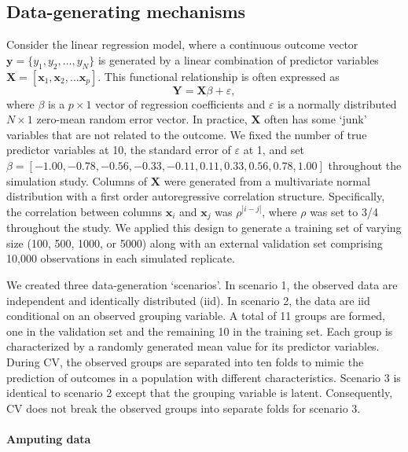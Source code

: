 \documentclass[AMA,STIX1COL,doublespace]{WileyNJD-v2}
\begin{document}
\subsection{Data-generating mechanisms} \label{subsec:data_gen}

Consider the linear regression model, where a continuous outcome vector
\(\textbf{y} = \lbrace y_1, y_2, \ldots, y_N\rbrace\) is generated by a
linear combination of predictor variables
\(\textbf{X} = \left[ \textbf{x}_1, \textbf{x}_2, \ldots \textbf{x}_p \right]\).
This functional relationship is often expressed as
\[\textbf{Y} = \textbf{X} \beta + \varepsilon,\] where \(\beta\) is a
\(p \times 1\) vector of regression coefficients and \(\varepsilon\) is
a normally distributed \(N \times 1\) zero-mean random error vector. In
practice, \(\textbf{X}\) often has some `junk' variables that are not
related to the outcome. We fixed the number of true predictor variables
at 10, the standard error of \(\varepsilon\) at 1, and set
\(\beta = [-1.00, -0.78, -0.56, -0.33, -0.11, 0.11, 0.33, 0.56, 0.78, 1.00]\)
throughout the simulation study. Columns of \(\textbf{X}\) were
generated from a multivariate normal distribution with a first order
autoregressive correlation structure. Specifically, the correlation
between columns \(\textbf{x}_i\) and \(\textbf{x}_j\) was
\(\rho^{\left| i-j \right|}\), where \(\rho\) was set to 3/4 throughout
the study. We applied this design to generate a training set of varying
size (100, 500, 1000, or 5000) along with an external validation set
comprising 10,000 observations in each simulated replicate.

We created three data-generation `scenarios'. In scenario 1, the
observed data are independent and identically distributed (iid). In
scenario 2, the data are iid conditional on an observed grouping
variable. A total of 11 groups are formed, one in the validation set and
the remaining 10 in the training set. Each group is characterized by a
randomly generated mean value for its predictor variables. During CV,
the observed groups are separated into ten folds to mimic the prediction
of outcomes in a population with different characteristics. Scenario 3
is identical to scenario 2 except that the grouping variable is latent.
Consequently, CV does not break the observed groups into separate folds
for scenario 3.

\paragraph{Amputing data}
\end{document}
